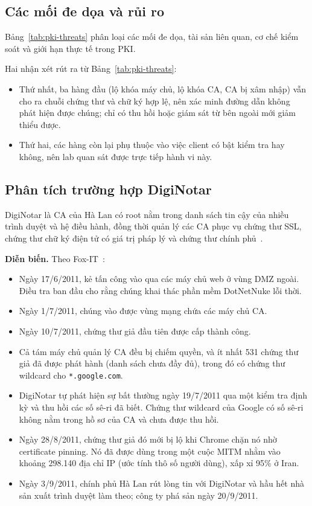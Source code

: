 \subsection{Các mối đe dọa và rủi ro}
\label{subsec:threats-and-risks}

Bảng~\ref{tab:pki-threats} phân loại các mối đe dọa, tài sản liên quan, cơ chế kiểm soát và giới hạn thực tế trong PKI.



Hai nhận xét rút ra từ Bảng~\ref{tab:pki-threats}:
\begin{itemize}\setlength{\itemsep}{1pt}\setlength{\parskip}{0pt}
    \item Thứ nhất, ba hàng đầu (lộ khóa máy chủ, lộ khóa CA, CA bị xâm nhập) vẫn cho ra chuỗi chứng thư và chữ ký hợp lệ, nên xác minh đường dẫn không phát hiện được chúng; chỉ có thu hồi hoặc giám sát từ bên ngoài mới giảm thiểu được.
    \item Thứ hai, các hàng còn lại phụ thuộc vào việc client có bật kiểm tra hay không, nên lab quan sát được trực tiếp hành vi này.
\end{itemize}

\subsection{Phân tích trường hợp DigiNotar}
\label{subsec:diginotar-case}

DigiNotar là CA của Hà Lan có root nằm trong danh sách tin cậy của nhiều trình duyệt và hệ điều hành, đồng thời quản lý các CA phục vụ chứng thư SSL, chứng thư chữ ký điện tử có giá trị pháp lý và chứng thư chính phủ~\cite{prins2011diginotar}.

\noindent\textbf{Diễn biến.} Theo Fox-IT~\cite{prins2011diginotar}:
\begin{itemize}\setlength{\itemsep}{1pt}\setlength{\parskip}{0pt}
    \item Ngày 17/6/2011, kẻ tấn công vào qua các máy chủ web ở vùng DMZ ngoài. Điều tra ban đầu cho rằng chúng khai thác phần mềm DotNetNuke lỗi thời.
    \item Ngày 1/7/2011, chúng vào được vùng mạng chứa các máy chủ CA.
    \item Ngày 10/7/2011, chứng thư giả đầu tiên được cấp thành công.
    \item Cả tám máy chủ quản lý CA đều bị chiếm quyền, và ít nhất 531 chứng thư giả đã được phát hành (danh sách chưa đầy đủ), trong đó có chứng thư wildcard cho \texttt{*.google.com}.
    \item DigiNotar tự phát hiện sự bất thường ngày 19/7/2011 qua một kiểm tra định kỳ và thu hồi các số sê-ri đã biết. Chứng thư wildcard của Google có số sê-ri không nằm trong hồ sơ của CA và chưa được thu hồi.
    \item Ngày 28/8/2011, chứng thư giả đó mới bị lộ khi Chrome chặn nó nhờ certificate pinning. Nó đã được dùng trong một cuộc MITM nhằm vào khoảng 298.140 địa chỉ IP (ước tính thô số người dùng), xấp xỉ 95\% ở Iran.
    \item Ngày 3/9/2011, chính phủ Hà Lan rút lòng tin với DigiNotar và hầu hết nhà sản xuất trình duyệt làm theo; công ty phá sản ngày 20/9/2011.
\end{itemize}

